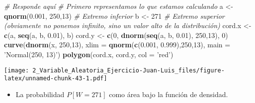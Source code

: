 \documentclass[
]{article}
\newenvironment{Shaded}{\begin{snugshade}}{\end{snugshade}}
\newcommand{\CommentTok}[1]{\textcolor[rgb]{0.56,0.35,0.01}{\textit{#1}}}
\newcommand{\DataTypeTok}[1]{\textcolor[rgb]{0.13,0.29,0.53}{#1}}
\newcommand{\DecValTok}[1]{\textcolor[rgb]{0.00,0.00,0.81}{#1}}
\newcommand{\FloatTok}[1]{\textcolor[rgb]{0.00,0.00,0.81}{#1}}
\newcommand{\KeywordTok}[1]{\textcolor[rgb]{0.13,0.29,0.53}{\textbf{#1}}}
\newcommand{\NormalTok}[1]{#1}
\newcommand{\StringTok}[1]{\textcolor[rgb]{0.31,0.60,0.02}{#1}}
\providecommand{\tightlist}{%
  \setlength{\itemsep}{0pt}\setlength{\parskip}{0pt}}
\begin{document}
\begin{Shaded}
\begin{Highlighting}[]
\CommentTok{# Responde aquí}
\CommentTok{# Primero representamos lo que estamos calculando}
\NormalTok{a <-}\StringTok{ }\KeywordTok{qnorm}\NormalTok{(}\FloatTok{0.001}\NormalTok{, }\DecValTok{250}\NormalTok{,}\DecValTok{13}\NormalTok{) }\CommentTok{# Extremo inferior}
\NormalTok{b <-}\StringTok{ }\DecValTok{271} \CommentTok{# Extremo superior (obviamente no ponemos infinito, sino un valor alto de la distribución)}
\NormalTok{cord.x <-}\StringTok{ }\KeywordTok{c}\NormalTok{(a, }\KeywordTok{seq}\NormalTok{(a, b, }\FloatTok{0.01}\NormalTok{), b) }
\NormalTok{cord.y <-}\StringTok{ }\KeywordTok{c}\NormalTok{(}\DecValTok{0}\NormalTok{, }\KeywordTok{dnorm}\NormalTok{(}\KeywordTok{seq}\NormalTok{(a, b, }\FloatTok{0.01}\NormalTok{), }\DecValTok{250}\NormalTok{,}\DecValTok{13}\NormalTok{), }\DecValTok{0}\NormalTok{) }
\KeywordTok{curve}\NormalTok{(}\KeywordTok{dnorm}\NormalTok{(x, }\DecValTok{250}\NormalTok{,}\DecValTok{13}\NormalTok{), }\DataTypeTok{xlim =} \KeywordTok{qnorm}\NormalTok{(}\KeywordTok{c}\NormalTok{(}\FloatTok{0.001}\NormalTok{, }\FloatTok{0.999}\NormalTok{),}\DecValTok{250}\NormalTok{,}\DecValTok{13}\NormalTok{), }\DataTypeTok{main =} \StringTok{'Normal(250, 13)'}\NormalTok{) }
\KeywordTok{polygon}\NormalTok{(cord.x, cord.y, }\DataTypeTok{col =} \StringTok{'red'}\NormalTok{)}
\end{Highlighting}
\end{Shaded}

\texttt{[image: 2\_Variable\_Aleatoria\_Ejercicio-Juan-Luis\_files/figure-latex/unnamed-chunk-43-1.pdf]}

\begin{itemize}
\tightlist
\item
  La probabilidad \(P [W = 271]\) como área bajo la función de densidad.
\end{itemize}
\end{document}
